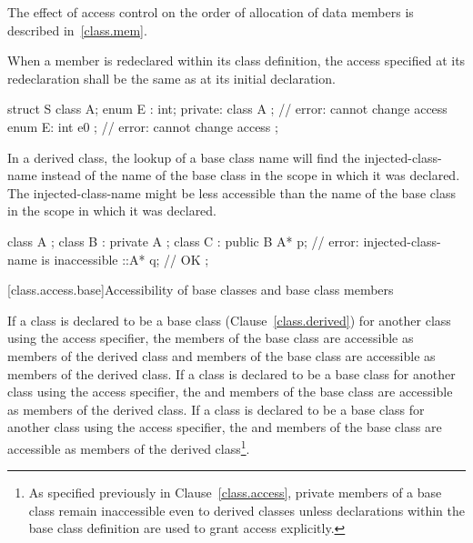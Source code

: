 \pnum
\enternote The effect of access control on the order of allocation
of data members is described in~\ref{class.mem}.\exitnote

\pnum
When a member is redeclared within its class definition,
the access specified at its redeclaration shall
be the same as at its initial declaration.
\enterexample

\begin{codeblock}
struct S {
  class A;
  enum E : int;
private:
  class A { };        // error: cannot change access
  enum E: int { e0 }; // error: cannot change access
};
\end{codeblock}
\exitexample

\pnum
\enternote
In a derived class, the lookup of a base class name will find the
injected-class-name instead of the name of the base class in the scope
in which it was declared. The injected-class-name might be less accessible
than the name of the base class in the scope in which it was declared.
\exitnote

\enterexample
\begin{codeblock}
class A { };
class B : private A { };
class C : public B {
  A* p;             // error: injected-class-name  is inaccessible
  ::A* q;           // OK
};
\end{codeblock}
\exitexample

[class.access.base]{Accessibility of base classes and base class members}%
%
%
%
%

\pnum
If a class is declared to be a base class (Clause~\ref{class.derived}) for another class using the
access specifier, the
members of the base class are accessible as
members of the derived class and
members of the base class are accessible as
members of the derived class.
If a class is declared to be a base class for another class using the
access specifier, the
and
members of the base class are accessible as
members of the derived class.
If a class is declared to be a base class for another class using the
access specifier, the
and
members of the base class are accessible as
members of the derived class\footnote{As specified previously in Clause~\ref{class.access},
private members of a base class remain inaccessible even to derived classes
unless
declarations within the base class definition are used to grant access explicitly.}.

